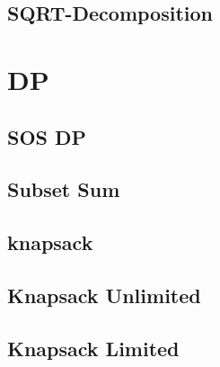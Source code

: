 \documentclass[a4paper,10pt,twocolumn,oneside]{article}
\begin{document}
\subsection{SQRT-Decomposition}


%

%

%

\section{DP}

\subsection{SOS DP}


\subsection{Subset Sum}


\subsection{knapsack}


\subsection{Knapsack Unlimited}


\subsection{Knapsack Limited}

\end{document}
